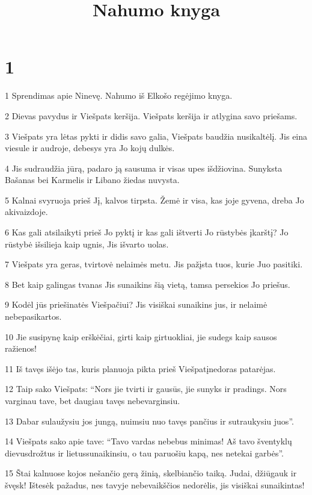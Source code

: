 

\title{Nahumo knyga}

\chapter{1}


\par 1 Sprendimas apie Ninevę. Nahumo iš Elkošo regėjimo knyga. 
\par 2 Dievas pavydus ir Viešpats keršija. Viešpats keršija ir atlygina savo priešams. 
\par 3 Viešpats yra lėtas pykti ir didis savo galia, Viešpats baudžia nusikaltėlį. Jis eina viesule ir audroje, debesys yra Jo kojų dulkės. 
\par 4 Jis sudraudžia jūrą, padaro ją sausuma ir visas upes išdžiovina. Sunyksta Bašanas bei Karmelis ir Libano žiedas nuvysta. 
\par 5 Kalnai svyruoja prieš Jį, kalvos tirpsta. Žemė ir visa, kas joje gyvena, dreba Jo akivaizdoje. 
\par 6 Kas gali atsilaikyti prieš Jo pyktį ir kas gali ištverti Jo rūstybės įkarštį? Jo rūstybė išsilieja kaip ugnis, Jis išvarto uolas. 
\par 7 Viešpats yra geras, tvirtovė nelaimės metu. Jis pažįsta tuos, kurie Juo pasitiki. 
\par 8 Bet kaip galingas tvanas Jis sunaikins šią vietą, tamsa persekios Jo priešus. 
\par 9 Kodėl jūs priešinatės Viešpačiui? Jis visiškai sunaikins jus, ir nelaimė nebepasikartos. 
\par 10 Jie susipynę kaip erškėčiai, girti kaip girtuokliai, jie sudegs kaip sausos ražienos! 
\par 11 Iš tavęs išėjo tas, kuris planuoja pikta prieš Viešpatį­nedoras patarėjas. 
\par 12 Taip sako Viešpats: “Nors jie tvirti ir gausūs, jie sunyks ir pradings. Nors varginau tave, bet daugiau tavęs nebevarginsiu. 
\par 13 Dabar sulaužysiu jos jungą, nuimsiu nuo tavęs pančius ir sutraukysiu juos”. 
\par 14 Viešpats sako apie tave: “Tavo vardas nebebus minimas! Aš tavo šventyklų dievus­drožtus ir lietus­sunaikinsiu, o tau paruošiu kapą, nes netekai garbės”. 
\par 15 Štai kalnuose kojos nešančio gerą žinią, skelbiančio taiką. Judai, džiūgauk ir švęsk! Ištesėk pažadus, nes tavyje nebevaikščios nedorėlis, jis visiškai sunaikintas!


